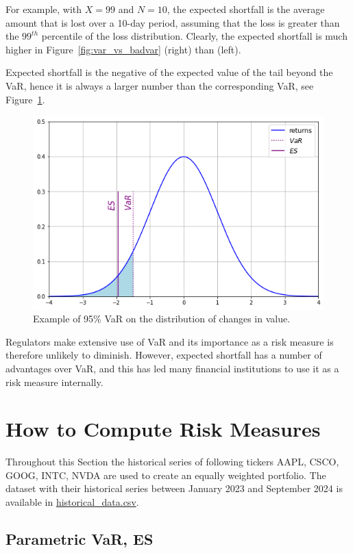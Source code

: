 For example, with $X = 99$ and $N = 10$, the expected shortfall is the average amount that is lost over a 10-day period, assuming that the loss is greater than the $99^{th}$ percentile of the loss distribution.  Clearly, the expected shortfall is much higher in Figure~\ref{fig:var_vs_badvar} (right) than (left). 

Expected shortfall is the negative of the expected value of the tail beyond the VaR, hence it is always a larger number than the corresponding VaR, see Figure~\ref{fig:es_loss}.

\begin{figure}[htb]
\centering
\includegraphics[width=0.6\linewidth]{figures/es}
\caption{Example of 95\% VaR on the distribution of changes in value.}
\label{fig:es_loss}
\end{figure}

Regulators make extensive use of VaR and its importance as a risk measure is therefore unlikely to diminish. However, expected shortfall has a number of advantages over VaR, and this has led many financial institutions to use it as a risk measure internally. 

\section{How to Compute Risk Measures}
\label{how-to-estimate-the-var}

Throughout this Section the historical series of following tickers AAPL, CSCO, GOOG, INTC, NVDA are used to create an equally weighted portfolio. The dataset with their historical series between January 2023 and September 2024 is available in \href{https://raw.githubusercontent.com/matteosan1/finance_course/develop/input_files/historical_data.csv}{historical\_data.csv}.

\subsection{Parametric VaR, ES}

